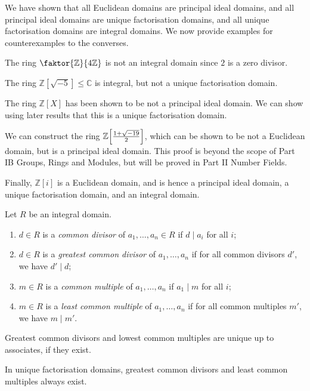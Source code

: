 \begin{example}
	We have shown that all Euclidean domains are principal ideal domains, and all principal ideal domains are unique factorisation domains, and all unique factorisation domains are integral domains.
	We now provide examples for counterexamples to the converses.

	The ring \( \faktor{\mathbb Z}{4\mathbb Z} \) is not an integral domain since \( 2 \) is a zero divisor.

	The ring \( \mathbb Z[\sqrt{-5}] \leq \mathbb C \) is integral, but not a unique factorisation domain.

	The ring \( \mathbb Z[X] \) has been shown to be not a principal ideal domain.
	We can show using later results that this is a unique factorisation domain.

	We can construct the ring \( \mathbb Z\qty[\frac{1+\sqrt{-19}}{2}] \), which can be shown to be not a Euclidean domain, but is a principal ideal domain.
	This proof is beyond the scope of Part IB Groups, Rings and Modules, but will be proved in Part II Number Fields.

	Finally, \( \mathbb Z[i] \) is a Euclidean domain, and is hence a principal ideal domain, a unique factorisation domain, and an integral domain.
\end{example}
\begin{definition}
	Let \( R \) be an integral domain.
	\begin{enumerate}
		\item \( d \in R \) is a \textit{common divisor} of \( a_1, \dots, a_n \in R \) if \( d \mid a_i \) for all \( i \);
		\item \( d \in R \) is a \textit{greatest common divisor} of \( a_1, \dots, a_n \) if for all common divisors \( d' \), we have \( d' \mid d \);
		\item \( m \in R \) is a \textit{common multiple} of \( a_1, \dots, a_n \) if \( a_1 \mid m \) for all \( i \);
		\item \( m \in R \) is a \textit{least common multiple} of \( a_1, \dots, a_n \) if for all common multiples \( m' \), we have \( m \mid m' \).
	\end{enumerate}
\end{definition}
\begin{remark}
	Greatest common divisors and lowest common multiples are unique up to associates, if they exist.
\end{remark}
\begin{proposition}
	In unique factorisation domains, greatest common divisors and least common multiples always exist.
\end{proposition}

